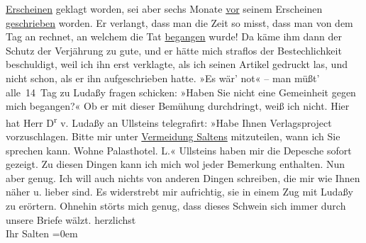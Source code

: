 \begin{ledgroupsized}[t]{13cm}
                  \uline{Erscheinen} geklagt worden, sei aber sechs Monate
                  \uline{vor} seinem Erscheinen \uline{geschrieben} worden. Er verlangt, dass man die Zeit so misst, dass man von
               dem Tag an rechnet, an welchem die Tat \uline{begangen}
               wurde! Da käme ihm dann der Schutz der Verjährung zu gute, und er hätte mich straflos
               der Bestechlichkeit beschuldigt, weil ich ihn erst verklagte, als ich seinen Artikel gedruckt las, und
               nicht schon, als er ihn aufgeschrieben hatte. »Es wär’ not« – man müßt’ alle 14 Tag
               zu Ludaßy fragen schicken: »Haben Sie nicht
               eine Gemeinheit gegen mich begangen?« Ob er mit dieser Bemühung durchdringt, weiß ich
               nicht.\pend
           \pstart
           Hier hat Herr D\textsuperscript{r}{ }v. Ludaßy an Ullsteins telegrafirt: »Habe Ihnen Verlagsproject vorzuschlagen. Bitte mir
               unter \uline{Vermeidung Saltens} mitzuteilen, wann ich Sie
               sprechen kann. Wohne Palasthotel. L.« Ullsteins haben mir die Depesche sofort gezeigt.\pend
           \pstart
           Zu diesen Dingen kann ich mich wol jeder Bemerkung enthalten.\pend
           \pstart
           Nun aber genug. Ich will auch nichts von anderen Dingen {\pb}schreiben, die mir wie Ihnen
               näher u. lieber sind. Es widerstrebt mir aufrichtig, sie in einem Zug mit Ludaßy zu erörtern. Ohnehin störts mich genug,
               dass dieses Schwein sich immer durch unsere Briefe wälzt.\pend
           \pstart
           herzlichst {\\[\baselineskip]}Ihr \spacefill\mbox{Salten}\pend
           \leftskip=0em{}
         
         \endnumbering{}\end{ledgroupsized}  \newcommand{\dateiname}{L03425}\newcommand{\titel}{Felix Salten an Arthur Schnitzler, 17. 5. 1906}\newcommand{\editorInnen}{Martin Anton Müller und Laura Untner}
      